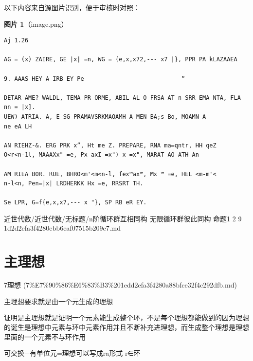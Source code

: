 \begin{note}
以下内容来自源图片识别，便于审核时对照：

\textbf{图片 1}（image.png）
\begin{Verbatim}[fontsize=\small]
Aj 1.26

AG = (x) ZAIRE, GE |x| =n, WG = {e,x,x72,--- x7 |}, PPR PA kLAZAAEA

9. AAAS HEY A IRB EY Pe                            “

DETAR AME? WALDL, TEMA PR ORME, ABIL AL O FRSA AT n SRR EMA NTA, FLA nn = |x].
UEW) ATRIA. A, E-SG PRAMAVSRKMAOAMH A MEN BA;s Bo, MOAMN A
ne eA LH

AN RIEHZ-&. ERG PRK x”, Ht me Z. PREPARE, RNA ma=qntr, HH qeZ
O<r<n-1l, MAAAXx" =e, Px axI =x") x =x", MARAT AO ATH An

AM RIEA BOR. RUE, BHRO<m'<m<n-l, fex™ax™, Mx ™ =e, HEL <m-m'<
n-l<n, Pen=|x| LRDHERKK Hx =e, RRSRT TH.

Se LPR, G=f{e,x,x7,--- x "}, SP RB eR EY.
\end{Verbatim}

\end{note}

\begin{note}[来源路径]

近世代数/近世代数/无标题/n阶循环群互相同构 无限循环群彼此同构 命题1 2 9 1d2d2efa3f4280ebb6eaf07515b209e7.md

\end{note}

\section*{主理想}

\begin{note}[来源上级主题]

7理想 (7\%E7\%90\%86\%E6\%83\%B3\%201edd2efa3f4280a88bfce32f4c292dfb.md)

\end{note}

\begin{note}[主理想]

主理想要求就是由一个元生成的理想

证明是主理想就是证明一个元素能生成整个环，不是每个理想都能做到的因为理想的诞生是理想中元素与环中元素作用并且不断补充进理想，而生成整个理想是理想里面的一个元素不与环作用

可交换+有单位元=理想可以写成ra形式 r∈环

\end{note}

